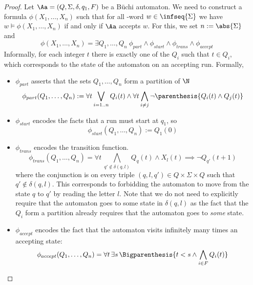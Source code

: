\begin{proof}
    Let $\Aa = (Q, \Sigma, \delta, q_1, F)$ be a Büchi automaton.
    We need to construct a formula $\phi(X_1, \dots, X_n)$
    such that for all \w-word $w \in \infseq{\Sigma}$
    we have $w \models \phi(X_1, \dots, X_n)$
    if and only if $\Aa$ accepts $w$.
    For this, we set $n := \abs{\Sigma}$ and \[
        \phi(X_1, \dots, X_n) =
            \exists Q_1, \dots, Q_{n} ~
            \phi_{part}
            \wedge
            \phi_{start}
            \wedge
            \phi_{trans}
            \wedge
            \phi_{accept}
    \]
    Informally, for each integer $t$ there is exactly one
    of the $Q_i$ such that $t \in Q_i$, which corresponds
    to the state of the automaton on an accepting run.
    Formally,
    \begin{itemize}
        \item $\phi_{part}$ asserts that the sets $Q_1, \dots, Q_{n}$
            form a partition of $\N$
            \[\phi_{part}(Q_1, \dots, Q_n) :=
                \forall t \bigvee_{i=1..n} Q_i(t)
                \wedge
                \forall t \bigwedge_{i \neq j}
                    \neg \parenthesis{Q_i(t) \wedge Q_j(t)}
            \]
        \item $\phi_{start}$ encodes the facts that a run
            must start at $q_1$, so \[
                \phi_{start}(Q_1, \dots, Q_n) := Q_1(0)
            \]
        \item $\phi_{trans}$ encodes the transition function.
            \[
                \phi_{trans}(Q_1, \dots, Q_n) =
                \forall t~
                \bigwedge_{q' \notin \delta(q, l)}
                    Q_q(t) \wedge X_l(t) \implies \neg Q_{q'}(t + 1)
            \]
            where the conjunction is on every triple $(q, l, q') \in
                Q \times \Sigma \times Q$ such that $q' \notin \delta(q, l)$.
            This corresponds to forbidding the automaton to
            move from the state $q$ to $q'$ by reading the letter $l$.
            Note that we do not need to explicitly require that the
            automaton goes to some state in $\delta(q, l)$ as
            the fact that the $Q_i$ form a partition already requires
            that the automaton goes to \textit{some} state.
        \item $\phi_{accept}$ encodes the fact that the automaton
            visits infinitely many times an accepting state:
            \[
                \phi_{accept}(Q_1, \dots, Q_n) =
                \forall t\, \exists s\, \Bigparenthesis{
                    t < s \wedge \bigwedge_{i \in F} Q_i(t)
                }
            \]
    \end{itemize}


\end{proof}
